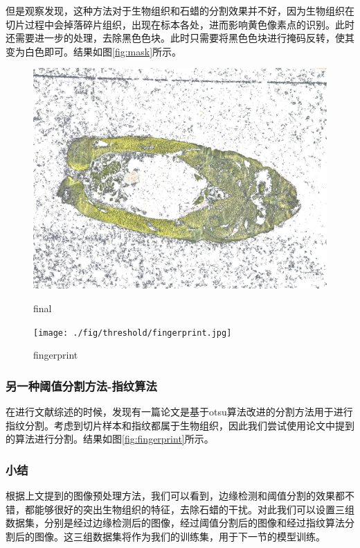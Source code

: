 但是观察发现，这种方法对于生物组织和石蜡的分割效果并不好，因为生物组织在切片过程中会掉落碎片组织，出现在标本各处，进而影响黄色像素点的识别。此时还需要进一步的处理，去除黑色色块。此时只需要将黑色色块进行掩码反转，使其变为白色即可。结果如图\autoref{fig:mask}所示。

\begin{figure}
    \centering
    \begin{minipage}{0.45\textwidth}
        \centering
        \includegraphics[width=\textwidth]{./fig/threshold/final.jpg}
        \caption{final}
        \label{fig:mask}
    \end{minipage}
    \begin{minipage}{0.45\textwidth}
        \centering
        \texttt{[image: ./fig/threshold/fingerprint.jpg]}
        \caption{fingerprint}
        \label{fig:fingerprint}
    \end{minipage}
\end{figure}

\subsubsection{另一种阈值分割方法-指纹算法}
在进行文献综述的时候，发现有一篇论文是基于otsu算法改进的分割方法用于进行指纹分割。考虑到切片样本和指纹都属于生物组织，因此我们尝试使用论文中提到的算法进行分割。结果如图\autoref{fig:fingerprint}所示。

\subsubsection{小结}
根据上文提到的图像预处理方法，我们可以看到，边缘检测和阈值分割的效果都不错，都能够很好的突出生物组织的特征，去除石蜡的干扰。对此我们可以设置三组数据集，分别是经过边缘检测后的图像，经过阈值分割后的图像和经过指纹算法分割后的图像。这三组数据集将作为我们的训练集，用于下一节的模型训练。

